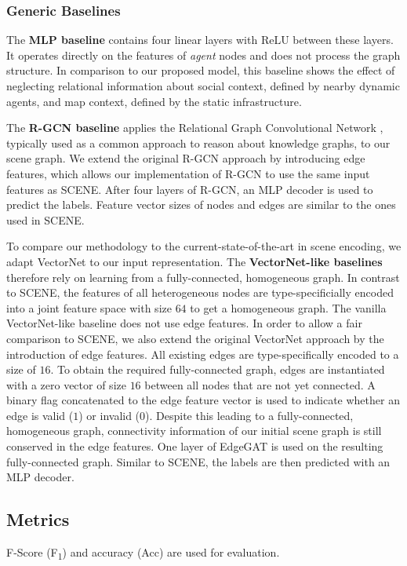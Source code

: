 \documentclass[letterpaper, 10 pt, journal, twoside]{IEEEtran}
\begin{document}
\subsubsection{Generic Baselines}
The \textbf{MLP baseline} contains four linear layers with $\mathrm{ReLU}$ between these layers.
It operates directly on the features of \textit{agent} nodes and does not process the graph structure.
In comparison to our proposed model, this baseline shows the effect of neglecting relational information about social context, defined by nearby dynamic agents, and map context, defined by the static infrastructure.

The \textbf{R-GCN baseline} applies the Relational Graph Convolutional Network \cite{Schlichtkrull2018}, typically used as a common approach to reason about knowledge graphs, to our scene graph.
We extend the original R-GCN approach by introducing edge features, which allows our implementation of R-GCN to use the same input features as SCENE.
After four layers of R-GCN, an MLP decoder is used to predict the labels.
Feature vector sizes of nodes and edges are similar to the ones used in SCENE.

To compare our methodology to the current-state-of-the-art in scene encoding, we adapt VectorNet \cite{Gao2020} to our input representation.
The \textbf{VectorNet-like baselines} therefore rely on learning from a fully-connected, homogeneous graph.
In contrast to SCENE, the features of all heterogeneous nodes are type-specificially encoded into a joint feature space with size $64$ to get a homogeneous graph.
The vanilla VectorNet-like baseline does not use edge features.
In order to allow a fair comparison to SCENE, we also extend the original VectorNet approach by the introduction of edge features.
All existing edges are type-specifically encoded to a size of $16$.
To obtain the required fully-connected graph, edges are instantiated with a zero vector of size $16$ between all nodes that are not yet connected.
A binary flag concatenated to the edge feature vector is used to indicate whether an edge is valid ($1$) or invalid ($0$).
Despite this leading to a fully-connected, homogeneous graph, connectivity information of our initial scene graph is still conserved in the edge features.
One layer of EdgeGAT is used on the resulting fully-connected graph.
Similar to SCENE, the labels are then predicted with an MLP decoder.

\subsection{Metrics}
F-Score (F\textsubscript{1}) and accuracy (Acc) are used for evaluation.
\end{document}
